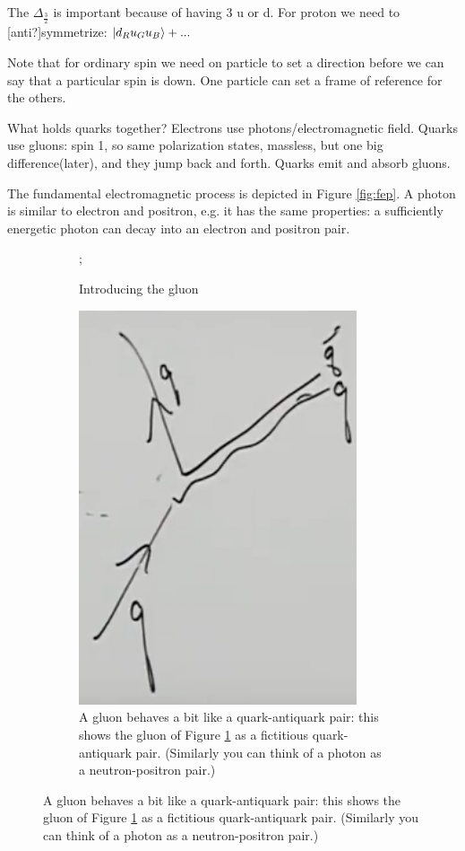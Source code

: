 \documentclass[]{article}
\begin{document}
The  $\Delta_\frac{3}{2}$ is important because of having 3 u or d. For proton we need to [anti?]symmetrize: $\ket{d_R u_G u_B}+...$

Note that for ordinary spin we need on particle to set a direction before we can say that a particular spin is down. One particle can set a frame of reference for the others.

What holds quarks together? Electrons use photons/electromagnetic field. Quarks use gluons: spin 1, so same polarization states, massless, but one big difference(later), and they jump back and forth. Quarks emit and absorb gluons.

The fundamental electromagnetic process is depicted in Figure \ref{fig:fep}. A photon is similar to electron and positron, e.g. it has the same properties: a sufficiently energetic photon can decay into an electron and positron pair.

\begin{figure}[H]
	\caption{Gluons}
	\begin{subfigure}[t]{0.45\textwidth}
		\caption{Introducing the gluon}\label{fig2-2-gluon1}
		;
	\end{subfigure}
	\begin{subfigure}[t]{0.45\textwidth}
		\caption{A gluon behaves a bit like a quark-antiquark pair: this shows the gluon of Figure \ref{fig2-2-gluon1} as a fictitious quark-antiquark pair.  (Similarly you can think of a photon as a neutron-positron pair.)}
		\includegraphics[width=0.9\textwidth]{2-2-gluon2}
	\end{subfigure}

\end{figure}
\end{document}
